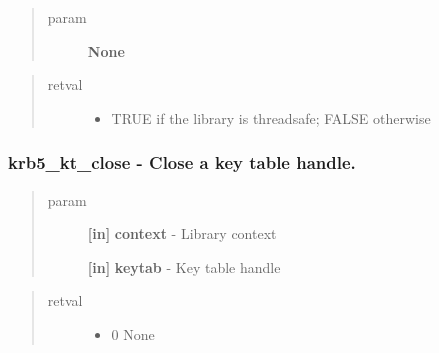\documentclass[letterpaper,10pt,english]{sphinxmanual}
\begin{document}
\begin{fulllineitems}
\label{appdev/refs/api/krb5_is_thread_safe:c.krb5_is_thread_safe}
\end{fulllineitems}

\begin{quote}\begin{description}
\item[{param}] \leavevmode
\textbf{None}

\end{description}\end{quote}
\begin{quote}\begin{description}
\item[{retval}] \leavevmode\begin{itemize}
\item {} 
TRUE   if the library is threadsafe; FALSE otherwise

\end{itemize}

\end{description}\end{quote}


\subsubsection{krb5\_kt\_close -  Close a key table handle.}
\label{appdev/refs/api/krb5_kt_close:krb5-kt-close-close-a-key-table-handle}\label{appdev/refs/api/krb5_kt_close::doc}

\begin{fulllineitems}
\label{appdev/refs/api/krb5_kt_close:c.krb5_kt_close}
\end{fulllineitems}

\begin{quote}\begin{description}
\item[{param}] \leavevmode
\textbf{{[}in{]}} \textbf{context} - Library context

\textbf{{[}in{]}} \textbf{keytab} - Key table handle

\end{description}\end{quote}
\begin{quote}\begin{description}
\item[{retval}] \leavevmode\begin{itemize}
\item {} 
0   None

\end{itemize}

\end{description}\end{quote}
\end{document}
